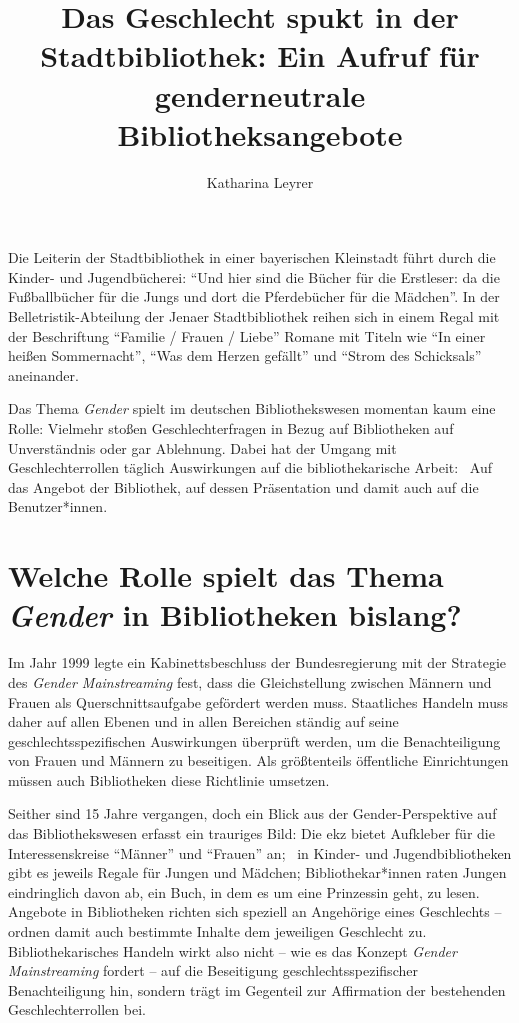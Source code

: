 \documentclass[a4paper,
fontsize=11pt,
oneside,
numbers=noperiodatend,
parskip=half-,
bibliography=totoc,
final
]{scrartcl}
\title{\LARGE{Das Geschlecht spukt in der Stadtbibliothek: Ein Aufruf für genderneutrale Bibliotheksangebote}} %
\author{Katharina Leyrer} %
\date{}
\begin{document}
\maketitle
\thispagestyle{fancyplain} 


Die Leiterin der Stadtbibliothek in einer bayerischen Kleinstadt führt
durch die Kinder- und Jugendbücherei: \enquote{Und hier sind die Bücher
für die Erstleser: da die Fußballbücher für die Jungs und dort die
Pferdebücher für die Mädchen}. In der Belletristik-Abteilung der Jenaer
Stadtbibliothek reihen sich in einem Regal mit der Beschriftung
\enquote{Familie / Frauen / Liebe} Romane mit Titeln wie \enquote{In
einer heißen Sommernacht}, \enquote{Was dem Herzen gefällt} und
\enquote{Strom des Schicksals} aneinander.

Das Thema \emph{Gender} spielt im deutschen Bibliothekswesen momentan
kaum eine Rolle: Vielmehr stoßen Geschlechterfragen in Bezug auf
Bibliotheken auf Unverständnis oder gar Ablehnung. Dabei hat der Umgang
mit Geschlechterrollen täglich Auswirkungen auf die bibliothekarische
Arbeit:~ Auf das Angebot der Bibliothek, auf dessen Präsentation und
damit auch auf die Benutzer*innen.

\section*{Welche Rolle spielt das Thema \emph{Gender} in
Bibliotheken
bislang?}\label{welche-rolle-spielt-das-thema-gender-in-bibliotheken-bislang}

Im Jahr 1999 legte ein Kabinettsbeschluss der Bundesregierung mit der
Strategie des \emph{Gender Mainstreaming} fest, dass die Gleichstellung
zwischen Männern und Frauen als Querschnittsaufgabe gefördert werden
muss. Staatliches Handeln muss daher auf allen Ebenen und in allen
Bereichen ständig auf seine geschlechtsspezifischen Auswirkungen
überprüft werden, um die Benachteiligung von Frauen und Männern zu
beseitigen. Als größtenteils öffentliche Einrichtungen müssen auch
Bibliotheken diese Richtlinie umsetzen.

Seither sind 15 Jahre vergangen, doch ein Blick aus der
Gender-Perspektive auf das Bibliothekswesen erfasst ein trauriges Bild:
Die ekz bietet Aufkleber für die Interessenskreise \enquote{Männer} und
\enquote{Frauen} an;~ in Kinder- und Jugendbibliotheken gibt es jeweils
Regale für Jungen und Mädchen; Bibliothekar*innen raten Jungen
eindringlich davon ab, ein Buch, in dem es um eine Prinzessin geht, zu
lesen. Angebote in Bibliotheken richten sich speziell an Angehörige
eines Geschlechts -- ordnen damit auch bestimmte Inhalte dem jeweiligen
Geschlecht zu. Bibliothekarisches Handeln wirkt also nicht -- wie es das
Konzept \emph{Gender Mainstreaming} fordert -- auf die Beseitigung
geschlechtsspezifischer Benachteiligung hin, sondern trägt im Gegenteil
zur Affirmation der bestehenden Geschlechterrollen bei.
\end{document}
